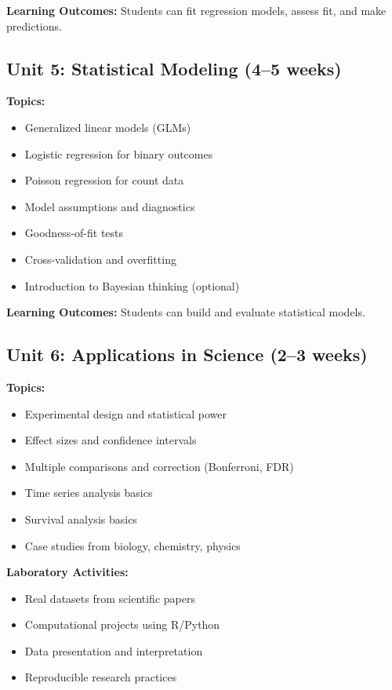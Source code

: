 \documentclass[12pt,oneside]{book}
\begin{document}
\textbf{Learning Outcomes:} Students can fit regression models, assess fit, and make predictions.

\subsection{Unit 5: Statistical Modeling (4--5 weeks)}

\textbf{Topics:}
\begin{itemize}
    \item Generalized linear models (GLMs)
    \item Logistic regression for binary outcomes
    \item Poisson regression for count data
    \item Model assumptions and diagnostics
    \item Goodness-of-fit tests
    \item Cross-validation and overfitting
    \item Introduction to Bayesian thinking (optional)
\end{itemize}

\textbf{Learning Outcomes:} Students can build and evaluate statistical models.

\subsection{Unit 6: Applications in Science (2--3 weeks)}

\textbf{Topics:}
\begin{itemize}
    \item Experimental design and statistical power
    \item Effect sizes and confidence intervals
    \item Multiple comparisons and correction (Bonferroni, FDR)
    \item Time series analysis basics
    \item Survival analysis basics
    \item Case studies from biology, chemistry, physics
\end{itemize}

\textbf{Laboratory Activities:}
\begin{itemize}
    \item Real datasets from scientific papers
    \item Computational projects using R/Python
    \item Data presentation and interpretation
    \item Reproducible research practices
\end{itemize}
\end{document}
